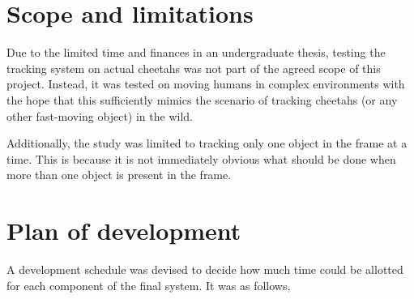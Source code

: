 \section{Scope and limitations}
Due to the limited time and finances in an undergraduate thesis, testing the tracking system on actual cheetahs was not part of the agreed scope of this project. Instead, it was tested on moving humans in complex environments with the hope that this sufficiently mimics the scenario of tracking cheetahs (or any other fast-moving object) in the wild.

Additionally, the study was limited to tracking only one object in the frame at a time. This is because it is not immediately obvious what should be done when more than one object is present in the frame.


\section{Plan of development}
A development schedule was devised to decide how much time could be allotted for each component of the final system. It was as follows,

